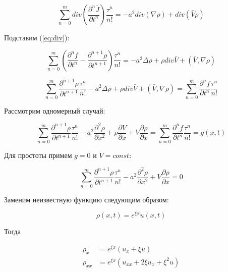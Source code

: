 \begin{equation}
\sum\limits_{n=0}^{m} div \left(\dfrac{\partial^n \bar{J}}{\partial t^n} \right) \dfrac{\tau^n}{n!} = -a^2 div(\nabla \rho) + div(\bar{V} \rho)
\end{equation}

Подставим (\ref{eq:div}):

\begin{equation}
\sum\limits_{n=0}^{m} \left(\dfrac{\partial^n f}{\partial t^n} - \dfrac{\partial^{n+1} \rho}{\partial t^{n+1}} \right) \dfrac{\tau^n}{n!} = - a^2 \Delta \rho + \rho div\bar{V} + (\bar{V},\nabla \rho)
\end{equation}

\begin{equation}
\sum\limits_{n=0}^{m} \dfrac{\partial^{n+1} \rho}{\partial t^{n+1}} \dfrac{\tau^n}{n!} - a^2 \Delta \rho + \rho div\bar{V} + (\bar{V},\nabla \rho) = \sum\limits_{n=0}^{m} \dfrac{\partial^n f}{\partial t^n} \dfrac{\tau^n}{n!}
\end{equation}

Рассмотрим одномерный случай:

\begin{equation}
\sum\limits_{n=0}^{m} \dfrac{\partial^{n+1} \rho}{\partial t^{n+1}} \dfrac{\tau^n}{n!} - a^2 \dfrac{\partial^2 \rho}{\partial x^2} + \rho \dfrac{\partial V}{\partial x} + V \dfrac{\partial \rho}{\partial x} = \sum\limits_{n=0}^{m} \dfrac{\partial^n f}{\partial t^n} \dfrac{\tau^n}{n!} = g(x,t)
\end{equation}

Для простоты примем $g=0$ и $V=const$:

\begin{equation}
\sum\limits_{n=0}^{m} \dfrac{\partial^{n+1} \rho}{\partial t^{n+1}} \dfrac{\tau^n}{n!} - a^2 \dfrac{\partial^2 \rho}{\partial x^2} + V \dfrac{\partial \rho}{\partial x} = 0
\end{equation}

Заменим неизвестную функцию следующим образом:

\begin{equation}
\rho (x,t) = e^{\xi x} u(x,t)
\end{equation}

Тогда

\begin{align}
\rho_x & = e^{\xi x} (u_x + \xi u)\\
\rho_{xx} & = e^{\xi x} (u_{xx} + 2 \xi u_x + \xi^2 u)
\end{align}

